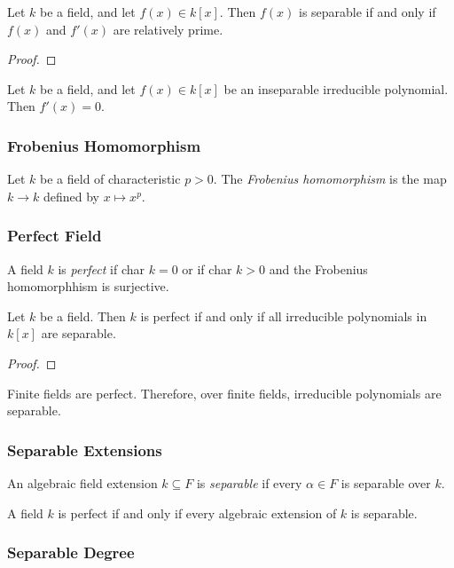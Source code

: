 \begin{lemma}
Let $k$ be a field, and let $f(x) \in k[x]$. Then $f(x)$ is separable if and only if $f(x)$ and $f'(x)$
are relatively prime.
\end{lemma}

\begin{proof}

\end{proof}

\begin{lemma}
Let $k$ be a field, and let $f(x) \in k[x]$ be an inseparable irreducible polynomial. Then $f'(x) = 0$.
\end{lemma}

\subsubsection{Frobenius Homomorphism}
Let $k$ be a field of characteristic $p > 0$. The \emph{Frobenius homomorphism} is
the map $k \rightarrow k$ defined by $x \mapsto x^p$.

\subsubsection{Perfect Field}
A field $k$ is \emph{perfect} if char $k = 0$ or if char $k > 0$ and the Frobenius homomorphhism is surjective.

\begin{proposition}
Let $k$ be a field. Then $k$ is perfect if and only if all irreducible polynomials in $k[x]$
are separable.
\end{proposition}

\begin{proof}

\end{proof}

\begin{corollary}
Finite fields are perfect. Therefore, over finite fields, irreducible polynomials are separable.
\end{corollary}

\subsubsection{Separable Extensions}
An algebraic field extension $k \subseteq F$ is \emph{separable} if every $\alpha \in F$ is separable over $k$.

\begin{proposition}
A field $k$ is perfect if and only if every algebraic extension of $k$ is separable.
\end{proposition}

\subsubsection{Separable Degree}